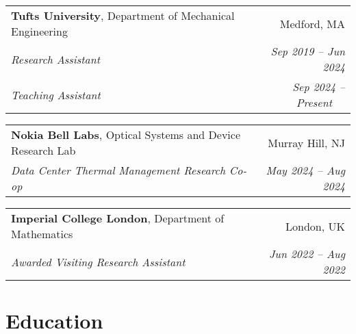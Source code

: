 \documentclass[letterpaper,11pt]{article}
\begin{document}
\newcommand{\RoleII}[4]{
  \vspace{0pt}\item[]
    \begin{tabular*}{1\textwidth}[t]{l@{\extracolsep{\fill}}r}
      {#1} & #2 \\
      \textit{#3} & \textit{\small #4} \\
    \end{tabular*}\vspace{-6pt}}

\newcommand{\RoleIIduble}[6]{
  \vspace{0pt}\item[]
    \begin{tabular*}{1\textwidth}[t]{l@{\extracolsep{\fill}}r}
      {#1} & #2 \\
      \textit{#3} & \textit{\small #4} \\
      \textit{#5} & \textit{\small #6} \\
    \end{tabular*}\vspace{-4pt}}
    
\EmpList

\RoleIIduble
{\textbf{Tufts University}, Department of Mechanical Engineering}{Medford, MA}
{Research Assistant}{Sep 2019 -- Jun 2024}
{Teaching Assistant}{Sep 2024 -- Present~~\,}

\RoleII
{\textbf{Nokia Bell Labs}, Optical Systems and Device Research Lab}{Murray Hill, NJ}
{Data Center Thermal Management Research Co-op}{May 2024 -- Aug 2024}
\RoleII
{\textbf{Imperial College London}, Department of Mathematics}{London, UK}
{Awarded Visiting Research Assistant}{Jun 2022 -- Aug 2022}
\EmpListEnd

  \vspace{-8pt}

\section{Education} %

\newcommand{\BeginEduList}{\begin{itemize}[leftmargin=0.00in]}
\newcommand{\EndEduList}{\end{itemize}\vspace{-5pt}}

\newcommand{\EduRole}[4]{
  \vspace{0pt}\item[]
    \begin{tabular*}{1\textwidth}[t]{l@{\extracolsep{\fill}}r}
      \textbf{#1} & #2 \\
      \textit{#3} & \textit{\small #4} \\
    \end{tabular*}\vspace{-8pt}}
\end{document}
